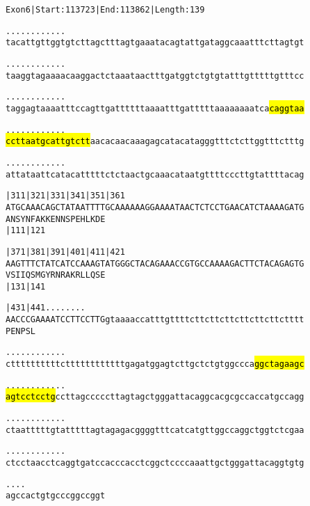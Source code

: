 \documentclass{article}
\begin{document}
\begin{alltt}
Exon 6 | Start: 113723 | End: 113862 | Length: 139

.    .    .    .    .    .    .    .    .    .    .    .    
tacattgttggtgtcttagctttagtgaaatacagtattgataggcaaatttcttagtgt

.    .    .    .    .    .    .    .    .    .    .    .    
taaggtagaaaacaaggactctaaataactttgatggtctgtgtatttgtttttgtttcc

.    .    .    .    .    .    .    .    .    .    .    .    
taggagtaaaatttccagttgattttttaaaatttgatttttaaaaaaaatca\hl{caggtaa}

.    .    .    .    .    .    .    .    .    .    .    .    
\hl{ccttaatgcattgtctt}aacacaacaaagagcatacatagggtttctcttggtttctttg

.    .    .    .    .    .    .    .    .    .    .    .    
attataattcatacatttttctctaactgcaaacataatgttttcccttgtattttacag

         |311      |321      |331      |341      |351      |361
ATGCAAACAGCTATAATTTTGCAAAAAAGGAAAATAACTCTCCTGAACATCTAAAAGATG
  A  N  S  Y  N  F  A  K  K  E  N  N  S  P  E  H  L  K  D  E
                             |111                          |121

         |371      |381      |391      |401      |411      |421
AAGTTTCTATCATCCAAAGTATGGGCTACAGAAACCGTGCCAAAAGACTTCTACAGAGTG
  V  S  I  I  Q  S  M  G  Y  R  N  R  A  K  R  L  L  Q  S  E
                             |131                          |141

         |431      |441 .    .    .    .    .    .    .    .
AACCCGAAAATCCTTCCTTGgtaaaaccatttgttttcttcttcttcttcttcttctttt
  P  E  N  P  S  L                                          

    .    .    .    .    .    .    .    .    .    .    .    .
cttttttttttcttttttttttttgagatggagtcttgctctgtggccca\hl{ggctagaagc}

    .    .    .    .    .    .    .    .    .    .    .    .
\hl{agtcctcctg}ccttagcccccttagtagctgggattacaggcacgcgccaccatgccagg

    .    .    .    .    .    .    .    .    .    .    .    .
ctaatttttgtatttttagtagagacggggtttcatcatgttggccaggctggtctcgaa

    .    .    .    .    .    .    .    .    .    .    .    .
ctcctaacctcaggtgatccacccacctcggctccccaaattgctgggattacaggtgtg

    .    .    .    .
agccactgtgcccggccggt
\end{alltt}
\end{document}
